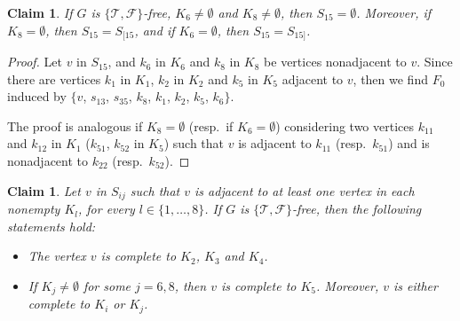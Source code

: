 \documentclass[12pt]{book}
\theoremstyle{plain}
\newtheorem{claim}[teo]{Claim}
\theoremstyle{remark}
\begin{document}



\begin{claim} \label{claim:co4tent_7} 
	If $G$ is $\{ \mathcal{T}, \mathcal{F} \}$-free, $K_6 \neq \emptyset$ and $K_8 \neq \emptyset$, then $S_{15} = \emptyset$.
	Moreover, if $K_8 = \emptyset$, then $S_{15} = S_{[15}$, and if $K_6 = \emptyset$, then $S_{15}=S_{15]}$.
\end{claim} 

\begin{proof}
Let $v$ in $S_{15}$, and $k_6$ in $K_6$ and $k_8$ in $K_8$ be vertices nonadjacent to $v$.
Since there are vertices $k_1$ in $K_1$, $k_2$ in $K_2$ and $k_5$ in $K_5$ adjacent to $v$, then we find $F_0$ induced by $\{ v$, $s_{13}$, $s_{35}$, $k_8$, $k_1$, $k_2$, $k_5$, $k_6 \}$.

The proof is analogous if $K_8 = \emptyset$ (resp.\ if $K_6 = \emptyset$) considering two vertices $k_{11}$ and $k_{12}$ in $K_1$ ($k_{51}$, $k_{52}$ in $K_5$) such that $v$ is adjacent to $k_{11}$ (resp.\ $k_{51}$) and is nonadjacent to $k_{22}$ (resp.\ $k_{52}$).
\end{proof}


\begin{claim} \label{claim:co4tent_8} %
	Let $v$ in $S_{ij}$ such that $v$ is adjacent to at least one vertex in each nonempty $K_l$, for every $l\in \{1, \ldots, 8\}$.
	If $G$ is $\{ \mathcal{T}, \mathcal{F} \}$-free, then the following statements hold:
	\begin{itemize}
		\item The vertex $v$ is complete to $K_2$, $K_3$ and $K_4$.
		\item If $K_j \neq \emptyset$ for some $j=6,8$, then $v$ is complete to $K_5$. Moreover, $v$ is either complete to $K_i$ or $K_j$. 
	\end{itemize}
\end{claim} 
\end{document}
